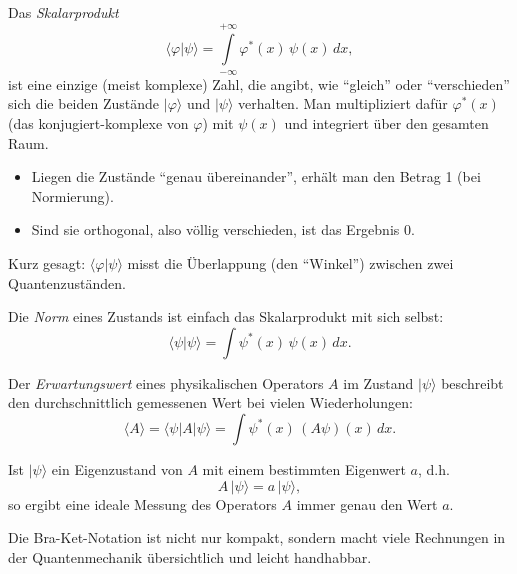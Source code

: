 	Das \emph{Skalarprodukt}
	\begin{equation}
	\langle \varphi | \psi \rangle = \int\limits_{-\infty}^{+\infty} \varphi^*(x)\,\psi(x)\,dx,
	\end{equation}
	ist eine einzige (meist komplexe) Zahl, die angibt, wie ``gleich'' oder ``verschieden'' sich die beiden Zustände $|\varphi\rangle$ und $|\psi\rangle$ verhalten.
	Man multipliziert dafür $\varphi^*(x)$ (das konjugiert-komplexe von $\varphi$) mit $\psi(x)$ und integriert über den gesamten Raum.
	\begin{itemize}
		\item Liegen die Zustände ``genau übereinander'', erhält man den Betrag 1 (bei Normierung).
		\item Sind sie orthogonal, also völlig verschieden, ist das Ergebnis 0.
	\end{itemize}
	Kurz gesagt:
	$\langle \varphi | \psi \rangle$ misst die Überlappung (den ``Winkel'') zwischen zwei Quantenzuständen.

	Die \emph{Norm} eines Zustands ist einfach das Skalarprodukt mit sich selbst:
	\begin{equation}
	\langle \psi | \psi \rangle = \int \psi^*(x)\,\psi(x)\,dx.
	\end{equation}

	Der \emph{Erwartungswert} eines physikalischen Operators $A$ im Zustand $|\psi\rangle$ beschreibt den durchschnittlich gemessenen Wert bei vielen Wiederholungen:
	\begin{equation}
	\langle A \rangle = \langle \psi | A | \psi \rangle = \int \psi^*(x)\,(A\psi)(x)\,dx.
	\end{equation}

	Ist $|\psi\rangle$ ein Eigenzustand von $A$ mit einem bestimmten Eigenwert $a$, d.h.
	\begin{equation}
	A\,|\psi\rangle = a\,|\psi\rangle,
	\end{equation}
	so ergibt eine ideale Messung des Operators $A$ immer genau den Wert $a$.

	Die Bra-Ket-Notation ist nicht nur kompakt, sondern macht viele Rechnungen in der Quantenmechanik übersichtlich und leicht handhabbar.

